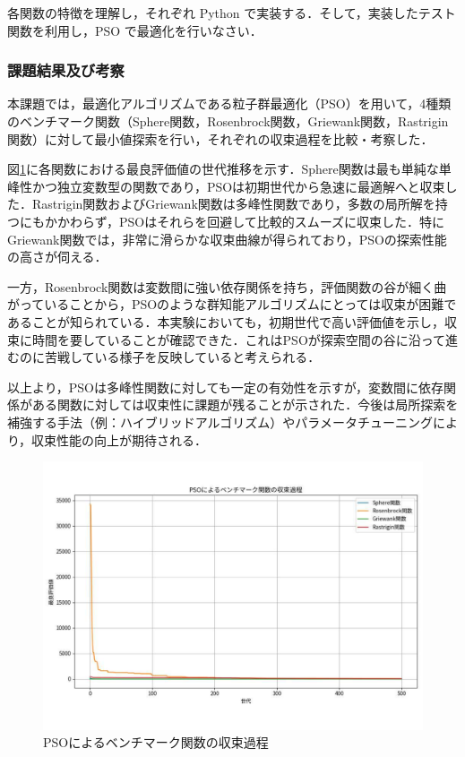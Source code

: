 各関数の特徴を理解し，それぞれ Python で実装する．そして，実装したテスト関数を利用し，PSO で最適化を行いなさい．
\subsubsection{課題結果及び考察}

本課題では，最適化アルゴリズムである粒子群最適化（PSO）を用いて，4種類のベンチマーク関数（Sphere関数，Rosenbrock関数，Griewank関数，Rastrigin関数）に対して最小値探索を行い，それぞれの収束過程を比較・考察した．

図\ref{fig:convergence}に各関数における最良評価値の世代推移を示す．Sphere関数は最も単純な単峰性かつ独立変数型の関数であり，PSOは初期世代から急速に最適解へと収束した．Rastrigin関数およびGriewank関数は多峰性関数であり，多数の局所解を持つにもかかわらず，PSOはそれらを回避して比較的スムーズに収束した．特にGriewank関数では，非常に滑らかな収束曲線が得られており，PSOの探索性能の高さが伺える．

一方，Rosenbrock関数は変数間に強い依存関係を持ち，評価関数の谷が細く曲がっていることから，PSOのような群知能アルゴリズムにとっては収束が困難であることが知られている．本実験においても，初期世代で高い評価値を示し，収束に時間を要していることが確認できた．これはPSOが探索空間の谷に沿って進むのに苦戦している様子を反映していると考えられる．

以上より，PSOは多峰性関数に対しても一定の有効性を示すが，変数間に依存関係がある関数に対しては収束性に課題が残ることが示された．今後は局所探索を補強する手法（例：ハイブリッドアルゴリズム）やパラメータチューニングにより，収束性能の向上が期待される．

\begin{figure}[H]
    \centering
    \includegraphics[width=0.8\linewidth]{figure/収束グラフ.pdf}
    \caption{PSOによるベンチマーク関数の収束過程}
    \label{fig:convergence}
\end{figure}

